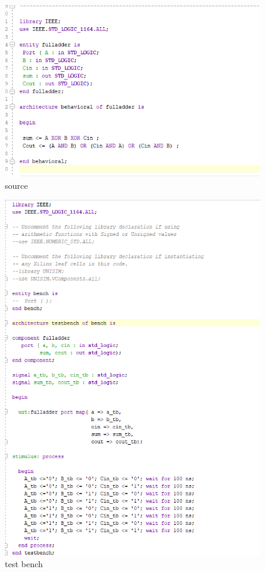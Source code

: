 \documentclass{article}
\begin{document}
\begin{figure}[h]
\begin{center}
\includegraphics[width=1\textwidth]{fullAdderSource.png} %
\caption{source}
\end{center}
\end{figure}

\begin{figure}[h]
\begin{center}
\includegraphics[width=1\textwidth]{fullAdderTest.png} %
\caption{test bench}
\end{center}
\end{figure}
\end{document}
